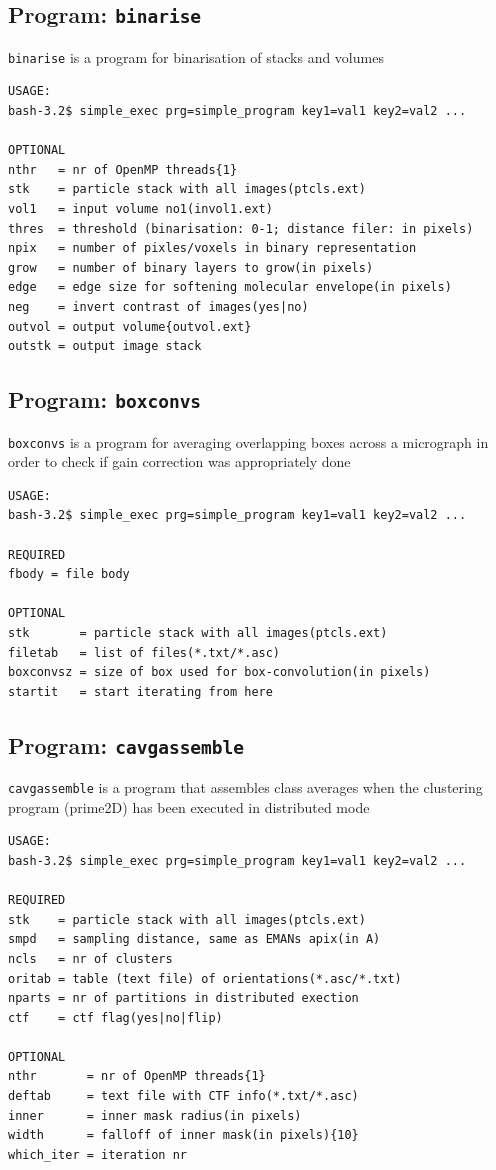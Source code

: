 \documentclass[a4paper,11pt]{article}
\newcommand{\prgname}[1]{\textcolor{NavyBlue}{\texttt{#1}}}
\begin{document}
\subsection{Program: \prgname{binarise}}
\label{binarise}
\prgname{binarise} is a program for binarisation of stacks and volumes

\begin{verbatim}
USAGE:
bash-3.2$ simple_exec prg=simple_program key1=val1 key2=val2 ...

OPTIONAL
nthr   = nr of OpenMP threads{1}
stk    = particle stack with all images(ptcls.ext)
vol1   = input volume no1(invol1.ext)
thres  = threshold (binarisation: 0-1; distance filer: in pixels)
npix   = number of pixles/voxels in binary representation
grow   = number of binary layers to grow(in pixels)
edge   = edge size for softening molecular envelope(in pixels)
neg    = invert contrast of images(yes|no)
outvol = output volume{outvol.ext}
outstk = output image stack
\end{verbatim}

\subsection{Program: \prgname{boxconvs}}
\label{boxconvs}
\prgname{boxconvs} is a program for averaging overlapping boxes across a micrograph in order to check if gain correction was appropriately done

\begin{verbatim}
USAGE:
bash-3.2$ simple_exec prg=simple_program key1=val1 key2=val2 ...

REQUIRED
fbody = file body

OPTIONAL
stk       = particle stack with all images(ptcls.ext)
filetab   = list of files(*.txt/*.asc)
boxconvsz = size of box used for box-convolution(in pixels)
startit   = start iterating from here
\end{verbatim}

\subsection{Program: \prgname{cavgassemble}}
\label{cavgassemble}
\prgname{cavgassemble} is a program that assembles class averages when the clustering program (prime2D) has been executed in distributed mode

\begin{verbatim}
USAGE:
bash-3.2$ simple_exec prg=simple_program key1=val1 key2=val2 ...

REQUIRED
stk    = particle stack with all images(ptcls.ext)
smpd   = sampling distance, same as EMANs apix(in A)
ncls   = nr of clusters
oritab = table (text file) of orientations(*.asc/*.txt)
nparts = nr of partitions in distributed exection
ctf    = ctf flag(yes|no|flip)

OPTIONAL
nthr       = nr of OpenMP threads{1}
deftab     = text file with CTF info(*.txt/*.asc)
inner      = inner mask radius(in pixels)
width      = falloff of inner mask(in pixels){10}
which_iter = iteration nr
\end{verbatim}
\end{document}
